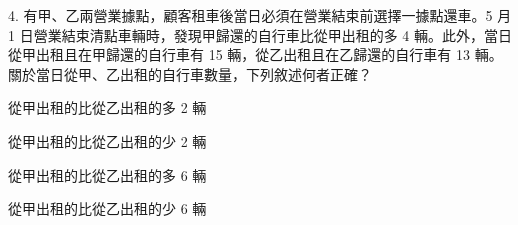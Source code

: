 \documentclass[12pt]{article}
\begin{document}
\begin{problem}
  \item[4.] 有甲、乙兩營業據點，顧客租車後當日必須在營業結束前選擇一據點還車。5 月 1 日營業結束清點車輛時，發現甲歸還的自行車比從甲出租的多 4 輛。此外，當日從甲出租且在甲歸還的自行車有 15 輛，從乙出租且在乙歸還的自行車有 13 輛。關於當日從甲、乙出租的自行車數量，下列敘述何者正確？
  \begin{choices}
    \item 從甲出租的比從乙出租的多 2 輛
    \item 從甲出租的比從乙出租的少 2 輛
    \item 從甲出租的比從乙出租的多 6 輛
    \item 從甲出租的比從乙出租的少 6 輛
  \end{choices}
\end{problem}
\end{document}
